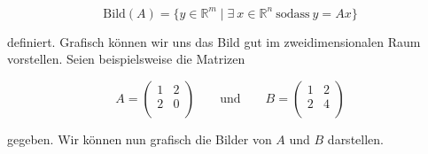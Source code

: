 \begin{equation*}
    \text{Bild}(A) = \{ y \in \mathbb{R}^m  \mid  \exists \ x \in \mathbb{R}^n \ \text{sodass} \ y = Ax \}
\end{equation*}

\vspace{0.25\baselineskip}

definiert. Grafisch können wir uns das Bild gut im zweidimensionalen Raum vorstellen. Seien beispielsweise die Matrizen

\begin{equation*}
    A = \begin{pmatrix}
        1 & 2 \\
        2 & 0 \\
    \end{pmatrix} \qquad \text{und} \qquad B = \begin{pmatrix}
        1 & 2 \\
        2 & 4 \\
    \end{pmatrix}
\end{equation*}

\vspace{0.25\baselineskip}

gegeben. Wir können nun grafisch die Bilder von \( A \) und \( B \) darstellen. 

